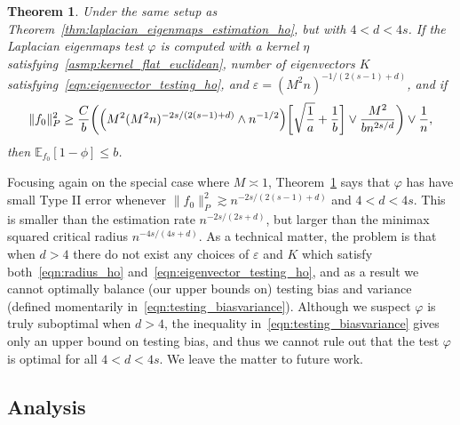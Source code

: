 \documentclass{article}
\newcommand{\1}{\mathbf{1}}
\newcommand{\Ebb}{\mathbb{E}}
\theoremstyle{alden}
\theoremstyle{aldenthm}
\newtheorem{theorem}{Theorem}
\theoremstyle{definition}
\theoremstyle{remark}
\begin{document}
\begin{theorem}
	\label{thm:laplacian_eigenmaps_testing_ho_suboptimal}
	Under the same setup as Theorem~\ref{thm:laplacian_eigenmaps_estimation_ho}, but with $4 < d < 4s$. If the Laplacian eigenmaps test $\varphi$ is computed with a kernel $\eta$ satisfying~\ref{asmp:kernel_flat_euclidean}, number of eigenvectors $K$ satisfying~\eqref{eqn:eigenvector_testing_ho}, and $\varepsilon = (M^2n)^{-1/(2(s - 1) + d)}$, and if 
	\begin{equation}
	\label{eqn:laplacian_eigenmaps_testing_criticalradius_ho_suboptimal}
	\|f_0\|_P^2 \geq \frac{C}{b}\biggl(\Bigl(M^2(M^2n)^{-2s/(2(s - 1) + d) } \wedge n^{-1/2}\Bigr)\biggl[\sqrt{\frac{1}{a}} + \frac{1}{b}\biggr] \vee \frac{M^2}{b n^{2s/d}} \biggr) \vee \frac{1}{n},
	\end{equation}
	then $\Ebb_{f_0}[1 - \phi] \leq b$.
\end{theorem}
Focusing again on the special case where $M \asymp 1$, Theorem~\ref{thm:laplacian_eigenmaps_testing_ho_suboptimal} says that $\varphi$ has have small Type II error whenever $\|f_0\|_P^2 \gtrsim n^{-2s/(2(s - 1) + d)}$ and $4 < d < 4s$. This is smaller than the estimation rate $n^{-2s/(2s + d)}$, but larger than the minimax squared critical radius $n^{-4s/(4s + d)}$. As a technical matter, the problem is that when $d > 4$ there do not exist any choices of $\varepsilon$ and $K$ which satisfy both~\eqref{eqn:radius_ho} and~\eqref{eqn:eigenvector_testing_ho}, and as a result we cannot optimally balance (our upper bounds on) testing bias and variance (defined momentarily in~\eqref{eqn:testing_biasvariance}). Although we suspect $\varphi$ is truly suboptimal when $d > 4$, the inequality in~\eqref{eqn:testing_biasvariance} gives only an upper bound on testing bias, and thus we cannot rule out that the test $\varphi$ is optimal for all $4 < d < 4s$. We leave the matter to future work.

\subsection{Analysis}
\label{subsec:analysis}
\end{document}
